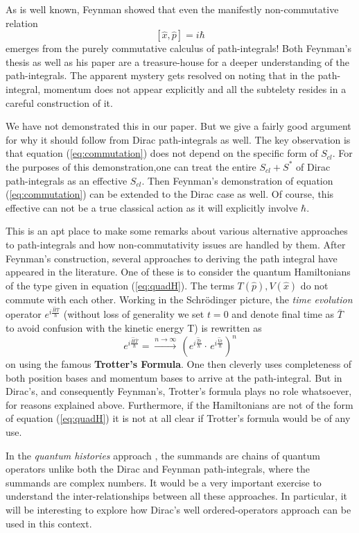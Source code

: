 \documentclass[12pt]{article}
\newcommand{\be}{\begin{equation}}
\newcommand{\ee}{\end{equation}}
\begin{document}
As is well known, Feynman showed that even the manifestly non-commutative relation
\be
\label{eq:commutation}
[{\hat x},{\hat p}] = i \hbar
\ee
emerges from the purely commutative calculus of path-integrals!
Both Feynman's thesis \cite{thesis} as well as his paper \cite{feynpaper} are a treasure-house for a
deeper understanding of the path-integrals. The apparent mystery gets resolved on noting that in the path-integral, momentum does not
appear explicitly and all the subtelety resides in a careful construction of it.

We have not demonstrated this in our paper. But we give a fairly good argument for why it should follow from Dirac path-integrals
as well. The key observation is that equation (\ref{eq:commutation}) does not depend on the specific form of $S_{cl}$. For the purposes
of this demonstration,one can treat the entire $S_{cl} + S^*$ of Dirac path-integrals as an effective $S_{cl}$. Then Feynman's
demonstration of equation (\ref{eq:commutation}) can be extended to the Dirac case as well. Of course, this effective can not be a true
classical action as it will explicitly involve $\hbar$.
 
This is an apt place to make some remarks about various alternative approaches to path-integrals and how non-commutativity issues are
handled by them. After Feynman's construction, several approaches to deriving the path integral have appeared in the literature. One
of these is to consider the quantum Hamiltonians of the type given in equation (\ref{eq:quadH}). The terms $T({\hat p}),V({\hat x})$
do not commute with each other. Working in the Schr\"odinger picture, the \emph{time evolution} operator $e^{i\frac{{\hat H}{\bar T}}{\hbar}}$
(without loss of generality we set $t = 0$ and denote final time as ${\bar T}$ to avoid confusion with the kinetic energy T) is rewritten as
\be
\label{eq:slicedTevol}
e^{i\frac{{\hat H}{\bar T}}{\hbar}} = \xrightarrow{n \rightarrow \infty}\,(e^{i \frac{{\hat T}\epsilon}{\hbar}}\cdot\,
e^{i \frac{{\hat V}\epsilon}{\hbar}})^n
\ee
on using the famous {\bf Trotter's Formula}. One then cleverly uses completeness of both position bases and momentum bases to arrive
at the path-integral. But in Dirac's, and consequently Feynman's, Trotter's formula plays no role whatsoever, for reasons explained above. 
Furthermore, if the Hamiltonians
are not of the form of equation (\ref{eq:quadH}) it is not at all clear if Trotter's formula would be of any use.

In the \emph{quantum histories} approach \cite{griffiths,histories}, the summands are chains of quantum operators unlike both the Dirac 
and Feynman 
path-integrals, where the summands are complex numbers. It would be a very important exercise to understand the inter-relationships between
all these approaches. In particular, it will be interesting to explore how Dirac's well ordered-operators approach can be used in this context.
\end{document}
